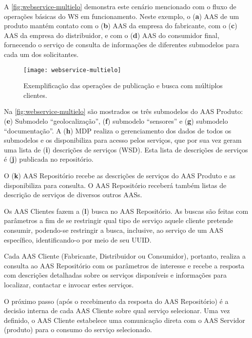 	A \autoref{fig:webservice-multielo} demonstra este cenário mencionado com o fluxo de operações básicas do WS em funcionamento. Neste exemplo, o (\textbf{a}) AAS de um produto mantém contato com o (\textbf{b}) AAS da empresa do fabricante, com o (\textbf{c}) AAS da empresa do distribuidor, e com o (\textbf{d}) AAS do consumidor final, fornecendo o serviço de consulta de informações de diferentes submodelos para cada um dos solicitantes.
	
	\begin{figure}[htb]
		\centering
		\caption{Exemplificação das operações de publicação e busca com múltiplos clientes.}
		\label{fig:webservice-multielo}
		\texttt{[image: webservice-multielo]}
	\end{figure}

	Na \autoref{fig:webservice-multielo} são mostrados os três submodelos do AAS Produto: (\textbf{e}) Submodelo ``geolocalização'', (\textbf{f}) submodelo ``sensores'' e (\textbf{g}) submodelo ``documentação''. A (\textbf{h}) MDP realiza o gerenciamento dos dados de todos os submodelos e os disponibiliza para acesso pelos serviços, que por sua vez geram uma lista de (\textbf{i}) descrições de serviços (WSD). Esta lista de descrições de serviços é (\textbf{j}) publicada no repositório.
	
	O (\textbf{k}) AAS Repositório recebe as descrições de serviços do AAS Produto e as disponibiliza para consulta. O AAS Repositório receberá também listas de descrição de serviços de diversos outros AASs.
	
	Os AAS Clientes fazem a (\textbf{l}) busca no AAS Repositório. As buscas são feitas com parâmetros a fim de se restringir qual tipo de serviço aquele cliente pretende consumir, podendo-se restringir a busca, inclusive, ao serviço de um AAS específico, identificando-o por meio de seu UUID.
	
	Cada AAS Cliente (Fabricante, Distribuidor ou Consumidor), portanto, realiza a consulta ao AAS Repositório com os parâmetros de interesse e recebe a resposta com descrições detalhadas sobre os serviços disponíveis e informações para localizar, contactar e invocar estes serviços.
	
	O próximo passo (após o recebimento da resposta do AAS Repositório) é a decisão interna de cada AAS Cliente sobre qual serviço selecionar. Uma vez definido, o AAS Cliente estabelece uma comunicação direta com o AAS Servidor (produto) para o consumo do serviço selecionado.
	

